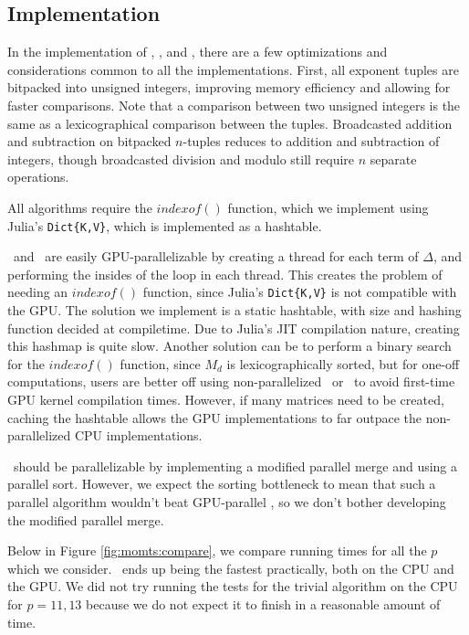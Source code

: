 \subsection{Implementation}

In the implementation of \triv, \merge, and \wicsalg, there are a 
few optimizations and considerations common to all the implementations.
First, all exponent tuples are bitpacked into 
unsigned integers, improving memory efficiency 
and allowing for faster comparisons.
Note that a comparison between two unsigned integers 
is the same as a lexicographical comparison between the tuples.
Broadcasted addition and subtraction on bitpacked 
$n$-tuples reduces to addition and subtraction of 
integers, though broadcasted division and modulo still 
require $n$ separate operations.

All algorithms require the $indexof()$ function, 
which we implement using Julia's \texttt{Dict\{K,V\}}, 
which is implemented as a hashtable.

\triv ~and \wicsalg ~are easily GPU-parallelizable by creating 
a thread for each term of $\Delta$, and performing the insides of the loop in each thread.
This creates the problem of needing an $indexof()$ function, 
since Julia's \texttt{Dict\{K,V\}} is not compatible with the GPU.
The solution we implement is a static hashtable, with size 
and hashing function decided at compiletime.
Due to Julia's JIT compilation nature, creating this 
hashmap is quite slow.
Another solution can be to perform a binary search 
for the $indexof()$ function, since $M_d$ is lexicographically 
sorted, but for one-off computations, users are better 
off using non-parallelized \merge ~or \wicsalg ~to avoid 
first-time GPU kernel compilation times.
However, if many matrices need to be created, caching 
the hashtable allows the GPU implementations to far outpace 
the non-parallelized CPU implementations.

\merge ~should be parallelizable by implementing a modified parallel merge and using a parallel sort. 
However, we expect the sorting bottleneck to mean that such a parallel algorithm wouldn't beat GPU-parallel \wicsalg,
so we don't bother developing the modified parallel merge.

Below in Figure \ref{fig:momts:compare}, we compare running times 
for all the \(p\) which we consider. 
\wicsalg \, ends up being the fastest practically, 
both on the CPU and the GPU.
We did not try running the tests for the 
trivial algorithm on the 
CPU for \(p=11,13\) because we do not expect 
it to finish in a reasonable
amount of time.

